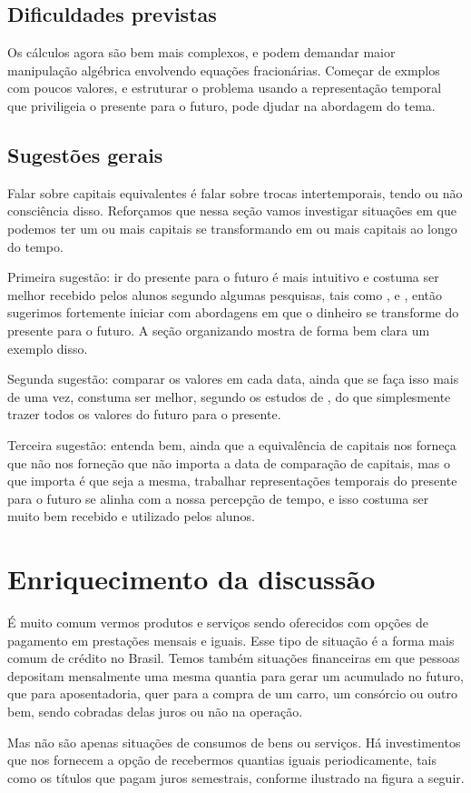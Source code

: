 \begin{paginatexto}
\subsection{Dificuldades previstas} Os cálculos agora são bem mais complexos, e podem demandar maior manipulação algébrica envolvendo equações fracionárias. Começar de exmplos com poucos valores, e estruturar o problema usando a representação temporal que priviligeia o presente para o futuro, pode djudar na abordagem do tema.

\subsection{Sugestões gerais}

Falar sobre capitais equivalentes é falar sobre trocas intertemporais, tendo ou não consciência disso. Reforçamos que nessa seção vamos investigar situações em que podemos ter um ou mais capitais se transformando em ou mais capitais ao longo do tempo.

Primeira sugestão: ir do presente para o futuro é mais intuitivo e costuma ser melhor recebido pelos alunos segundo algumas pesquisas, tais como \cite{campos2013}, \cite{muniz2016b} e \cite{santana2019}, então sugerimos fortemente iniciar com abordagens em que o dinheiro se transforme do presente para o futuro. A seção organizando mostra de forma bem clara um exemplo disso.

Segunda sugestão: comparar os valores em cada data, ainda que se faça isso mais de uma vez, constuma ser melhor, segundo os estudos de \cite{muniz2016a}, do que simplesmente trazer todos os valores do futuro para o presente.

Terceira sugestão: entenda bem, ainda que a equivalência de capitais nos forneça que não nos forneção que não importa a data de comparação de capitais, mas o que importa é que seja a mesma, trabalhar representações temporais do presente para o futuro se alinha com a nossa percepção de tempo, e isso costuma ser muito bem recebido e utilizado pelos alunos.

\section{Enriquecimento da discussão}

É muito comum vermos produtos e serviços sendo oferecidos com opções de pagamento em prestações mensais e iguais. Esse tipo de situação é a forma mais comum de crédito no Brasil. Temos também situações financeiras em que pessoas depositam mensalmente uma mesma quantia para gerar um acumulado no futuro, que para aposentadoria, quer para a compra de um carro, um consórcio ou outro bem, sendo cobradas delas juros ou não na operação.

Mas não são apenas situações de consumos de bens ou serviços. Há investimentos que nos fornecem a opção de recebermos quantias iguais periodicamente, tais como os títulos que pagam juros semestrais, conforme ilustrado na figura a seguir.
\end{paginatexto}

